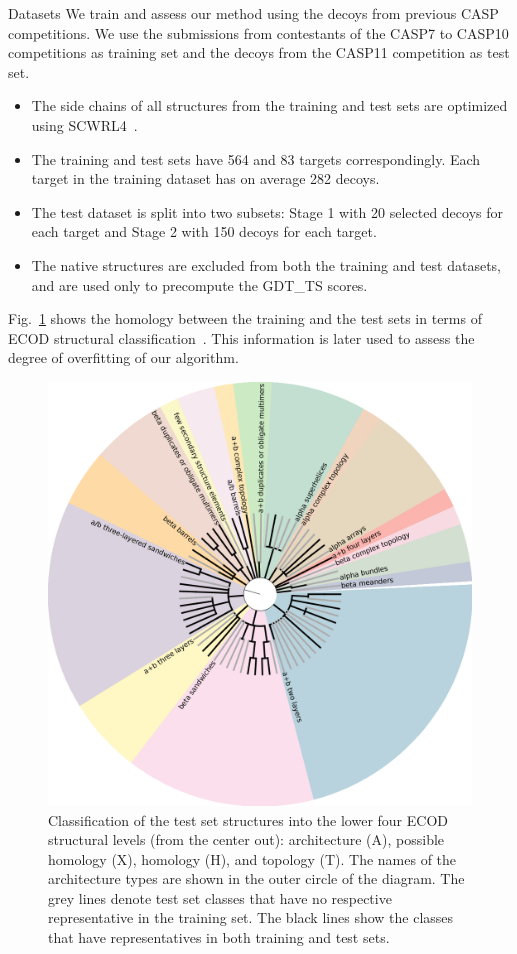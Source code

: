 \documentclass[final, unknownkeysallowed]{beamer}
\begin{document}
\begin{frame}{}
\begin{textblock}{39.0}
\begin{block}{Datasets}
We train and assess our method using the decoys from previous CASP
competitions. We use the submissions from contestants of the CASP7 to
CASP10 competitions as training set and the decoys from the CASP11
competition as test set.
\begin{itemize}
\item The side chains of all structures from the training and test
  sets are optimized using SCWRL4~\cite{krivov2009improved}.
\item The training and test sets have 564 and 83 targets
  correspondingly. Each target in the training dataset has on average
  282 decoys.
\item The test dataset is split into two subsets: Stage 1 with 20
  selected decoys for each target and Stage 2 with 150 decoys for each
  target.
\item The native structures are excluded from both the training and
  test datasets, and are used only to precompute the GDT\_TS scores.
\end{itemize}

\vspace{0.5cm}
Fig.~\ref{Fig:foldsGraph} shows the homology between the training and
the test sets in terms of ECOD structural
classification~\cite{cheng2014ecod}.  This information is later used
to assess the degree of overfitting of our algorithm.

\begin{figure}[H]
    \centering
    \includegraphics[width=0.50\linewidth]{../draft/Fig/folds_graph.png}
%
    \captionsetup{width=0.8\linewidth}
    \caption{Classification of the test set structures into the lower
      four ECOD structural levels (from the center out):
      architec\-ture (A), possible homology (X), homology (H), and
      topology (T). The names of the architecture types are shown in
      the outer circle of the diagram.  The grey lines denote test set
      classes that have no respective representative in the training
      set. The black lines show the classes that have representatives
      in both training and test sets.}
%
    \label{Fig:foldsGraph}
\end{figure}
\end{block}


\end{textblock}
\end{frame}
\end{document}
